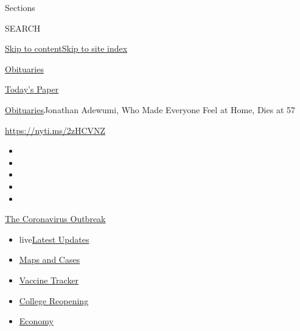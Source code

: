 Sections

SEARCH

\protect\hyperlink{site-content}{Skip to
content}\protect\hyperlink{site-index}{Skip to site index}

\href{https://www.nytimes3xbfgragh.onion/section/obituaries}{Obituaries}

\href{https://myaccount.nytimes3xbfgragh.onion/auth/login?response_type=cookie\&client_id=vi}{}

\href{https://www.nytimes3xbfgragh.onion/section/todayspaper}{Today's
Paper}

\href{/section/obituaries}{Obituaries}\textbar{}Jonathan Adewumi, Who
Made Everyone Feel at Home, Dies at 57

\url{https://nyti.ms/2zHCVNZ}

\begin{itemize}
\item
\item
\item
\item
\item
\end{itemize}

\href{https://www.nytimes3xbfgragh.onion/news-event/coronavirus?action=click\&pgtype=Article\&state=default\&region=TOP_BANNER\&context=storylines_menu}{The
Coronavirus Outbreak}

\begin{itemize}
\tightlist
\item
  live\href{https://www.nytimes3xbfgragh.onion/2020/08/04/world/coronavirus-covid-19.html?action=click\&pgtype=Article\&state=default\&region=TOP_BANNER\&context=storylines_menu}{Latest
  Updates}
\item
  \href{https://www.nytimes3xbfgragh.onion/interactive/2020/us/coronavirus-us-cases.html?action=click\&pgtype=Article\&state=default\&region=TOP_BANNER\&context=storylines_menu}{Maps
  and Cases}
\item
  \href{https://www.nytimes3xbfgragh.onion/interactive/2020/science/coronavirus-vaccine-tracker.html?action=click\&pgtype=Article\&state=default\&region=TOP_BANNER\&context=storylines_menu}{Vaccine
  Tracker}
\item
  \href{https://www.nytimes3xbfgragh.onion/2020/08/02/us/covid-college-reopening.html?action=click\&pgtype=Article\&state=default\&region=TOP_BANNER\&context=storylines_menu}{College
  Reopening}
\item
  \href{https://www.nytimes3xbfgragh.onion/live/2020/08/03/business/stock-market-today-coronavirus?action=click\&pgtype=Article\&state=default\&region=TOP_BANNER\&context=storylines_menu}{Economy}
\end{itemize}

